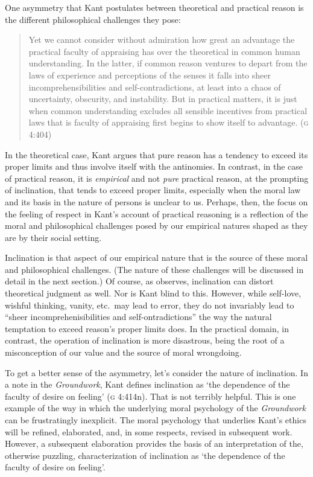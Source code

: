 \documentclass[12pt]{article}
\begin{document}

One asymmetry that Kant postulates between theoretical and practical reason is the different philosophical challenges they pose: 
\begin{quote}
    Yet we cannot consider without admiration how great an advantage the practical faculty of appraising has over the theoretical in common human understanding. In the latter, if common reason ventures to depart from the laws of experience and perceptions of the senses it falls into sheer incomprehensibilities and self-contradictions, at least into a chaos of uncertainty, obscurity, and instability. But in practical matters, it is just when common understanding excludes all sensible incentives from practical laws that is faculty of appraising first begins to show itself to advantage. (\textsc{g} 4:404)
\end{quote}
In the theoretical case, Kant argues that pure reason has a tendency to exceed its proper limits and thus involve itself with the antinomies. In contrast, in the case of practical reason, it is \emph{empirical} and not \emph{pure} practical reason, at the prompting of inclination, that tends to exceed proper limits, especially when the moral law and its basis in the nature of persons is unclear to us. Perhaps, then, the focus on the feeling of respect in Kant's account of practical reasoning is a reflection of the moral and philosophical challenges posed by our empirical natures shaped as they are by their social setting. 

Inclination is that aspect of our empirical nature that is the source of these moral and philosophical challenges. (The nature of these challenges will be discussed in detail in the next section.) Of course, as \citet[133]{Raz:2001ps} observes, inclination can distort theoretical judgment as well. Nor is Kant blind to this. However, while self-love, wishful thinking, vanity, etc.\ may lead to error, they do not invariably lead to ``sheer incomprehenisibilities and self-ontradictions'' the way the natural temptation to exceed reason's proper limits does. In the practical domain, in contrast, the operation of inclination is more disastrous, being the root of a misconception of our value and the source of moral wrongdoing.

To get a better sense of the asymmetry, let's consider the nature of inclination. In a note in the \emph{Groundwork}, Kant defines inclination as `the dependence of the faculty of desire on feeling' (\textsc{g} 4:414n). That is not terribly helpful. This is one example of the way in which the underlying moral psychology of the \emph{Groundwork} can be frustratingly inexplicit. The moral psychology that underlies Kant's ethics will be refined, elaborated, and, in some respects, revised in subsequent work. However, a subsequent elaboration provides the basis of an interpretation of the, otherwise puzzling, characterization of inclination as `the dependence of the faculty of desire on feeling'.
\end{document}

